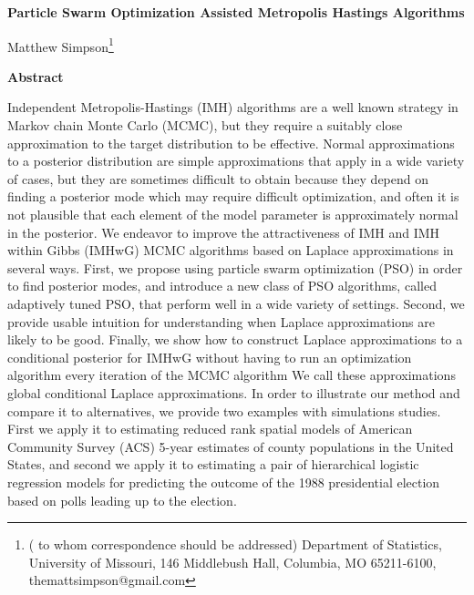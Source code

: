 \documentclass[12pt]{article}
\begin{document}
\thispagestyle{empty} \baselineskip=28pt

\begin{center}
{\LARGE{\bf Particle Swarm Optimization Assisted Metropolis Hastings Algorithms}}
\end{center}

\baselineskip=12pt
\vskip 2mm
\blind
{
  \begin{center}
    Matthew Simpson\footnote{(\baselineskip=10pt to whom correspondence should be addressed)
      Department of Statistics, University of Missouri,
      146 Middlebush Hall, Columbia, MO 65211-6100, themattsimpson@gmail.com}
  \end{center}
} \fi

\vskip 2mm
\begin{center}
{\large{\bf Abstract}}
\end{center}
Independent Metropolis-Hastings (IMH) algorithms are a well known strategy in Markov chain Monte Carlo (MCMC), but they require a suitably close approximation to the target distribution to be effective. Normal approximations to a posterior distribution are simple approximations that apply in a wide variety of cases, but they are sometimes difficult to obtain because they depend on finding a posterior mode which may require difficult optimization, and often it is not plausible that each element of the model parameter is approximately normal in the posterior. We endeavor to improve the attractiveness of IMH and IMH within Gibbs (IMHwG) MCMC algorithms based on Laplace approximations in several ways. First, we propose using particle swarm optimization (PSO) in order to find posterior modes, and introduce a new class of PSO algorithms, called adaptively tuned PSO, that perform well in a wide variety of settings. Second, we provide usable intuition for understanding when Laplace approximations are likely to be good. Finally, we show how to construct Laplace approximations to a conditional posterior for IMHwG without having to run an optimization algorithm every iteration of the MCMC algorithm We call these approximations global conditional Laplace approximations. In order to illustrate our method and compare it to alternatives, we provide two examples with simulations studies. First we apply it to estimating reduced rank spatial models of American Community Survey (ACS) 5-year estimates of county populations in the United States, and second we apply it to estimating a pair of hierarchical logistic regression models for predicting the outcome of the 1988 presidential election based on polls leading up to the election.
\baselineskip=12pt 
\end{document}
